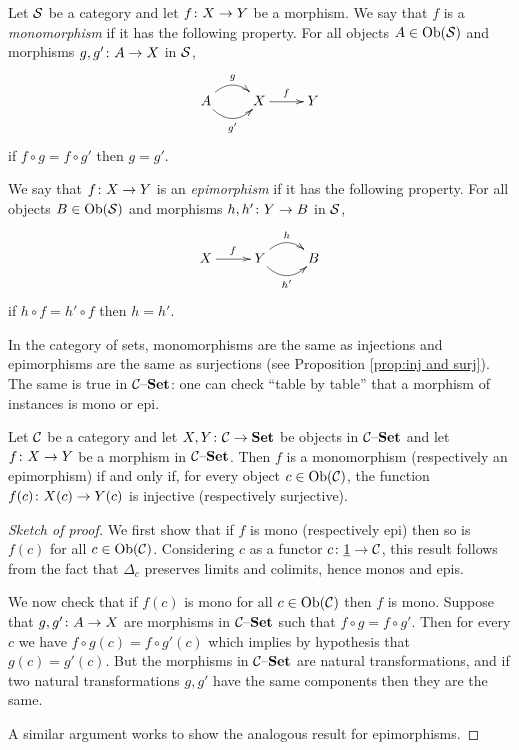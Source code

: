 \documentclass[CT4S-EN-RU]{subfiles}
\begin{document}
\begin{definition}\label{def:mono, epi}

Let $\mathcal{S}$ be a category and let $f\colon X\rightarrow Y$ be a morphism. We say that $f$ is a {\em monomorphism} if it has the following property. For all objects $A\in\textnormal{Ob}(\mathcal{S})$ and morphisms $g,g'\colon A\rightarrow X$ in $\mathcal{S}$, 
$$
\xymatrix{A\ar@/^1pc/[r]^g\ar@/_1pc/[r]_{g'}&X\ar[r]^f&Y}
$$
if $f\circ g=f\circ g'$ then $g=g'$.

We say that $f\colon X\rightarrow Y$ is an {\em epimorphism} if it has the following property. For all objects $B\in\textnormal{Ob}(\mathcal{S})$ and morphisms $h,h'\colon Y\rightarrow B$ in $\mathcal{S}$,
$$
\xymatrix{X\ar[r]^f&Y\ar@/^1pc/[r]^h\ar@/_1pc/[r]_{h'}&B}
$$
if $h\circ f=h'\circ f$ then $h=h'$.

\end{definition}

In the category of sets, monomorphisms are the same as injections and epimorphisms are the same as surjections (see Proposition \ref{prop:inj and surj}). The same is true in $\mathcal{C}{\text \textendash}{\bf Set}$: one can check “table by table” that a morphism of instances is mono or epi.

\begin{proposition}\label{prop:epi mono in c-set}

Let $\mathcal{C}$ be a category and let $X,Y\colon\mathcal{C}\rightarrow{\bf Set}$ be objects in $\mathcal{C}{\text \textendash}{\bf Set}$ and let $f\colon X\rightarrow Y$ be a morphism in $\mathcal{C}{\text \textendash}{\bf Set}$. Then $f$ is a monomorphism (respectively an epimorphism) if and only if, for every object $c\in\textnormal{Ob}(\mathcal{C})$, the function $f(c)\colon X(c)\rightarrow Y(c)$ is injective (respectively surjective). 

\end{proposition}

\begin{proof}[Sketch of proof]

We first show that if $f$ is mono (respectively epi) then so is $f(c)$ for all $c\in\textnormal{Ob}(\mathcal{C})$. Considering $c$ as a functor $c\colon\underline{1}\rightarrow\mathcal{C}$, this result follows from the fact that $\Delta_c$ preserves limits and colimits, hence monos and epis. 

We now check that if $f(c)$ is mono for all $c\in\textnormal{Ob}(\mathcal{C})$ then $f$ is mono. Suppose that $g,g'\colon A\rightarrow X$ are morphisms in $\mathcal{C}{\text \textendash}{\bf Set}$ such that $f\circ g=f\circ g'$. Then for every $c$ we have $f\circ g(c)=f\circ g'(c)$ which implies by hypothesis that $g(c)=g'(c)$. But the morphisms in $\mathcal{C}{\text \textendash}{\bf Set}$ are natural transformations, and if two natural transformations $g,g'$ have the same components then they are the same. 

A similar argument works to show the analogous result for epimorphisms.

\end{proof}
\end{document}
